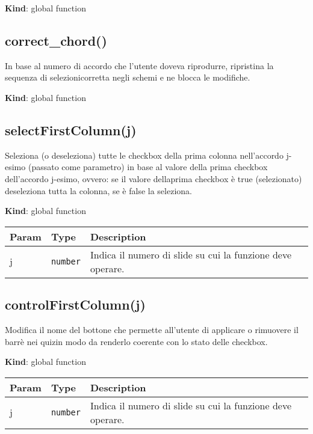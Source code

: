 \textbf{Kind}: global function\\
\protect\hypertarget{correct_chord}{}{}

\hypertarget{correct_chord-2}{%
\subsection{correct\_chord()}\label{correct_chord-2}}

In base al numero di accordo che l'utente doveva riprodurre, ripristina
la sequenza di selezionicorretta negli schemi e ne blocca le modifiche.

\textbf{Kind}: global function\\
\protect\hypertarget{selectFirstColumn}{}{}

\hypertarget{selectfirstcolumnj}{%
\subsection{selectFirstColumn(j)}\label{selectfirstcolumnj}}

Seleziona (o deseleziona) tutte le checkbox della prima colonna
nell'accordo j-esimo (passato come parametro) in base al valore della
prima checkbox dell'accordo j-esimo, ovvero: se il valore dellaprima
checkbox è true (selezionato) deseleziona tutta la colonna, se è false
la seleziona.

\textbf{Kind}: global function

\begin{tabularx}{\textwidth}{XXX}
\toprule
Param & Type & Description\tabularnewline
\midrule
\endhead
j & \texttt{number} & Indica il numero di slide su cui la funzione deve
operare.\tabularnewline
\bottomrule
\end{tabularx}

\protect\hypertarget{controlFirstColumn}{}{}

\hypertarget{controlfirstcolumnj}{%
\subsection{controlFirstColumn(j)}\label{controlfirstcolumnj}}

Modifica il nome del bottone che permette all'utente di applicare o
rimuovere il barrè nei quizin modo da renderlo coerente con lo stato
delle checkbox.

\textbf{Kind}: global function

\begin{tabularx}{\textwidth}{XXX}
\toprule
Param & Type & Description\tabularnewline
\midrule
\endhead
j & \texttt{number} & Indica il numero di slide su cui la funzione deve
operare.\tabularnewline
\bottomrule
\end{tabularx}

